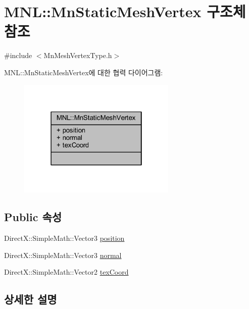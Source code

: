 \hypertarget{struct_m_n_l_1_1_mn_static_mesh_vertex}{}\section{M\+NL\+:\+:Mn\+Static\+Mesh\+Vertex 구조체 참조}
\label{struct_m_n_l_1_1_mn_static_mesh_vertex}


{\ttfamily \#include $<$Mn\+Mesh\+Vertex\+Type.\+h$>$}



M\+NL\+:\+:Mn\+Static\+Mesh\+Vertex에 대한 협력 다이어그램\+:\nopagebreak
\begin{figure}[H]
\begin{center}
\leavevmode
\includegraphics[width=214pt]{struct_m_n_l_1_1_mn_static_mesh_vertex__coll__graph}
\end{center}
\end{figure}
\subsection*{Public 속성}
\begin{DoxyCompactItemize}
\item 
Direct\+X\+::\+Simple\+Math\+::\+Vector3 \hyperlink{struct_m_n_l_1_1_mn_static_mesh_vertex_a45ad1d04c12d6742f1523476a134ecfb}{position}
\item 
Direct\+X\+::\+Simple\+Math\+::\+Vector3 \hyperlink{struct_m_n_l_1_1_mn_static_mesh_vertex_a84c6cf3477bd4e1e75c674abfd8e2d12}{normal}
\item 
Direct\+X\+::\+Simple\+Math\+::\+Vector2 \hyperlink{struct_m_n_l_1_1_mn_static_mesh_vertex_a75e7dc7e267a5bad4ee03a662aa57769}{tex\+Coord}
\end{DoxyCompactItemize}


\subsection{상세한 설명}


